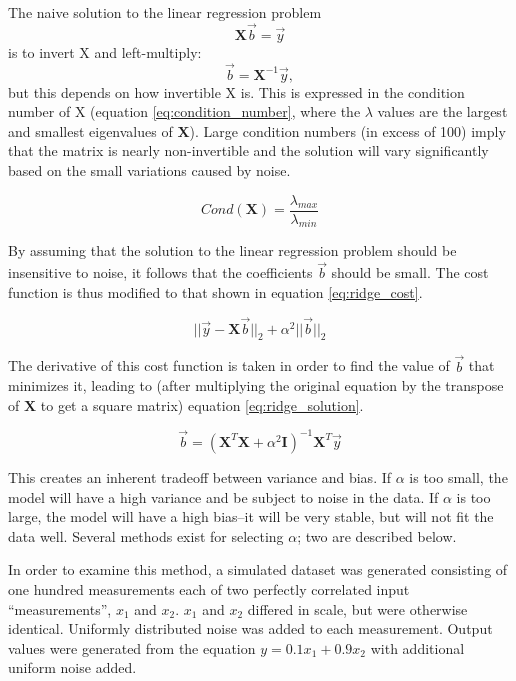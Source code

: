 \documentclass{IEEEtran}
\begin{document}
The naive solution to the linear regression problem $$\mathbf{X} \vec{b} = \vec{y}$$ is to invert $\mathrm{X}$ 
and left-multiply: $$\vec{b} = \mathbf{X}^{-1} \vec{y},$$ but this depends on how invertible X is. This is 
expressed in the condition number of X (equation \ref{eq:condition_number}, where the $\lambda$ values are the 
largest and smallest eigenvalues of $\mathbf{X}$). Large condition numbers (in excess of 100) imply that the 
matrix is nearly non-invertible and the solution will vary significantly based on the small variations caused 
by noise.

\begin{equation}
	Cond(\mathbf{X}) = \frac{\lambda_{max}}{\lambda_{min}}
	\label{eq:condition_number}
\end{equation}

By assuming that the solution to the linear regression problem should be insensitive to noise, it 
follows that the coefficients $\vec{b}$ should be small. The cost function is 
thus modified to that shown in equation \ref{eq:ridge_cost}.

\begin{equation}
	|| \vec{y} - \mathbf{X} \vec{b} ||_2 + \alpha^2 || \vec{b} ||_2
	\label{eq:ridge_cost}
\end{equation}

The derivative of this cost function is taken in order to find the value of $\vec{b}$ that minimizes 
it, leading to (after multiplying the original equation by the transpose of $\mathbf{X}$ to get a 
square matrix) equation \ref{eq:ridge_solution}.

\begin{equation}
	\vec{b} = (\mathbf{X}^T \mathbf{X} + \alpha^2 \mathbf{I})^{-1} \mathbf{X}^T \vec{y}
	\label{eq:ridge_solution}
\end{equation}

This creates an inherent tradeoff between variance and bias. If $\alpha$ is too small, the model will 
have a high variance and be subject to noise in the data. If $\alpha$ is too large, the model will have 
a high bias--it will be very stable, but will not fit the data well. Several methods exist for selecting 
$\alpha$; two are described below.

In order to examine this method, a simulated dataset was generated consisting of one hundred measurements 
each of two perfectly correlated input ``measurements'', $x_1$ and $x_2$. $x_1$ and $x_2$ differed in scale, 
but were otherwise identical. Uniformly distributed noise was added to each measurement. Output values were 
generated from the equation $y = 0.1 x_1 + 0.9 x_2$ with additional uniform noise added.
\end{document}
